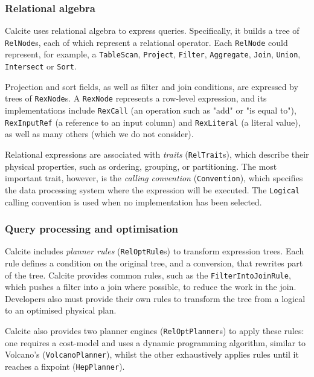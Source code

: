 \subsubsection{Relational algebra}

Calcite uses relational algebra \cite{Codd:1970:RMD:362384.362685} to express queries. Specifically, it builds a tree of \texttt{RelNode}s, each of which represent a relational operator. Each \texttt{RelNode} could represent, for example, a \texttt{TableScan}, \texttt{Project}, \texttt{Filter}, \texttt{Aggregate}, \texttt{Join}, \texttt{Union}, \texttt{Intersect} or \texttt{Sort}.

Projection and sort fields, as well as filter and join conditions, are expressed by trees of \texttt{RexNode}s. A \texttt{RexNode} represents a row-level expression, and its implementations include \texttt{RexCall} (an operation such as "add" or "is equal to"), \texttt{RexInputRef} (a reference to an input column) and \texttt{RexLiteral} (a literal value), as well as many others (which we do not consider).

Relational expressions are associated with \emph{traits} (\texttt{RelTrait}s), which describe their physical properties, such as ordering, grouping, or partitioning. The most important trait, however, is the \emph{calling convention} (\texttt{Convention}), which specifies the data processing system where the expression will be executed. The \texttt{Logical} calling convention is used when no implementation has been selected.

\subsubsection{Query processing and optimisation}

Calcite includes \emph{planner rules} (\texttt{RelOptRule}s) to transform expression trees. Each rule defines a condition on the original tree, and a conversion, that rewrites part of the tree. Calcite provides common rules, such as the \texttt{FilterIntoJoinRule}, which pushes a filter into a join where possible, to reduce the work in the join. Developers also must provide their own rules to transform the tree from a logical to an optimised physical plan.

Calcite also provides two planner engines (\texttt{RelOptPlanner}s) to apply these rules: one requires a cost-model and uses a dynamic programming algorithm, similar to Volcano's \cite{Graefe:1994:VEP:627290.627558} (\texttt{VolcanoPlanner}), whilst the other exhaustively applies rules until it reaches a fixpoint (\texttt{HepPlanner}).

